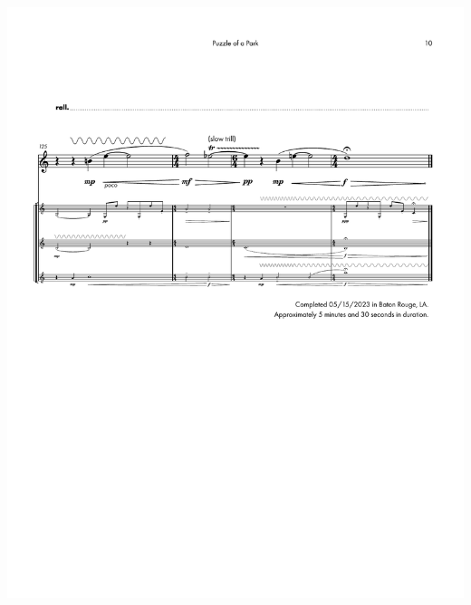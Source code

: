     \begin{center}
    \includegraphics[scale=0.75]{Scores/puzzlePart15.pdf}
    \end{center}
    \newpage



